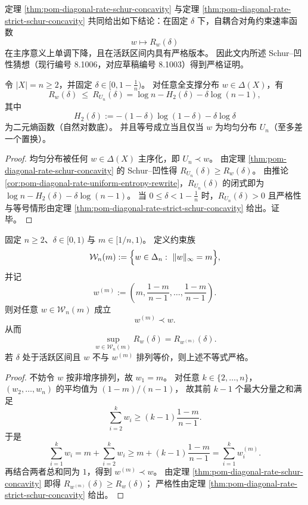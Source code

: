 \begin{remark}\label{rem:pom-diagonal-rate-schur-concavity-conjecture-81006}
定理 \ref{thm:pom-diagonal-rate-schur-concavity} 与定理 \ref{thm:pom-diagonal-rate-strict-schur-concavity}
共同给出如下结论：在固定 \(\delta\) 下，自耦合对角约束速率函数
\[
w\mapsto R_w(\delta)
\]
在主序意义上单调下降，且在活跃区间内具有严格版本。
因此文内所述 Schur--凹性猜想（现行编号 8.1006，对应草稿编号 8.1003）得到严格证明。
\end{remark}

\begin{corollary}[固定字母表大小的最优上包络]\label{cor:pom-diagonal-rate-uniform-global-upper}
令 \(|X|=n\ge 2\)，并固定 \(\delta\in[0,1-\tfrac1n)\)。
对任意全支撑分布 \(w\in\Delta(X)\)，有
\[
R_w(\delta)\ \le\ R_{U_n}(\delta)
=\log n-H_2(\delta)-\delta\log(n-1),
\]
其中
\[
H_2(\delta):=-(1-\delta)\log(1-\delta)-\delta\log\delta
\]
为二元熵函数（自然对数底）。
并且等号成立当且仅当 \(w\) 为均匀分布 \(U_n\)（至多差一个置换）。
\end{corollary}
\begin{proof}
均匀分布被任何 \(w\in\Delta(X)\) 主序化，即 \(U_n\prec w\)。
由定理 \ref{thm:pom-diagonal-rate-schur-concavity} 的 Schur--凹性得
\(
R_{U_n}(\delta)\ge R_w(\delta)
\)。
由推论 \ref{cor:pom-diagonal-rate-uniform-entropy-rewrite}，\(R_{U_n}(\delta)\) 的闭式即为
\(
\log n-H_2(\delta)-\delta\log(n-1)
\)。
当 \(0\le\delta<1-\tfrac1n\) 时，\(R_{U_n}(\delta)>0\) 且严格性与等号情形由定理 \ref{thm:pom-diagonal-rate-strict-schur-concavity} 给出。证毕。
\end{proof}

\begin{theorem}[固定最大原子质量下的极值分布]\label{thm:pom-diagonal-rate-max-atom-extremizer}
固定 \(n\ge 2\)、\(\delta\in[0,1)\) 与 \(m\in[1/n,1)\)。
定义约束族
\[
\mathcal W_n(m):=\Bigl\{w\in\Delta_n:\ \|w\|_\infty=m\Bigr\},
\]
并记
\[
w^{(m)}:=\left(m,\frac{1-m}{n-1},\dots,\frac{1-m}{n-1}\right).
\]
则对任意 \(w\in\mathcal W_n(m)\) 成立
\[
w^{(m)}\prec w.
\]
从而
\[
\sup_{w\in\mathcal W_n(m)}R_w(\delta)=R_{w^{(m)}}(\delta).
\]
若 \(\delta\) 处于活跃区间且 \(w\) 不与 \(w^{(m)}\) 排列等价，则上述不等式严格。
\end{theorem}
\begin{proof}
不妨令 \(w\) 按非增序排列，故 \(w_1=m\)。
对任意 \(k\in\{2,\dots,n\}\)，\((w_2,\dots,w_n)\) 的平均值为 \((1-m)/(n-1)\)，
故其前 \(k-1\) 个最大分量之和满足
\[
\sum_{i=2}^{k}w_i\ge (k-1)\frac{1-m}{n-1}.
\]
于是
\[
\sum_{i=1}^{k}w_i
=m+\sum_{i=2}^{k}w_i
\ge m+(k-1)\frac{1-m}{n-1}
=\sum_{i=1}^{k}w_i^{(m)}.
\]
再结合两者总和同为 \(1\)，得到 \(w^{(m)}\prec w\)。
由定理 \ref{thm:pom-diagonal-rate-schur-concavity} 即得
\(
R_{w^{(m)}}(\delta)\ge R_w(\delta)
\)；
严格性由定理 \ref{thm:pom-diagonal-rate-strict-schur-concavity} 给出。
\end{proof}

